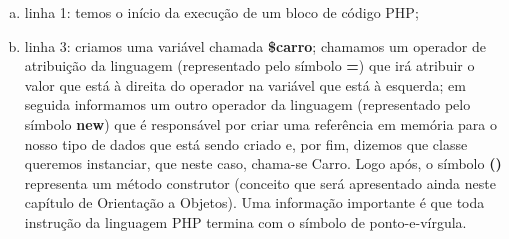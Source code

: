 \begin{enumerate}[a)]
    \item linha 1: temos o início da execução de um bloco de código PHP;
    \item linha 3: criamos uma variável chamada \textbf{\$carro};
    chamamos um operador de atribuição da linguagem (representado pelo símbolo
    \textbf{=}) que irá atribuir o valor que está à direita do operador na
    variável que está à esquerda; em seguida informamos um outro operador da
    linguagem (representado pelo símbolo \textbf{new}) que é responsável por
    criar uma referência em memória para o nosso tipo de dados que está sendo
    criado e, por fim, dizemos que classe queremos instanciar, que neste caso,
    chama-se Carro. Logo após, o símbolo \textbf{()} representa um método
    construtor (conceito que será apresentado ainda neste capítulo de Orientação
    a Objetos).
    Uma informação importante é que toda instrução da linguagem PHP termina
    com o símbolo de ponto-e-vírgula.
\end{enumerate}